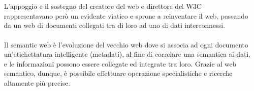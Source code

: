 \documentclass{article}
\theoremstyle{plain}
\theoremstyle{definition}
\begin{document}
\\
\\
L'appoggio e il sostegno del creatore del web e direttore del W3C rappresentavano però un evidente viatico e sprone a reinventare il web, passando da un web di documenti collegati tra di loro ad uno di dati interconnessi.
\footnotemark
{}
\\
\\
Il semantic web è l'evoluzione del vecchio web dove si associa ad ogni documento un'etichettatura intelligente (metadati), al fine di correlare una semantica ai dati, e le informazioni possono essere collegate ed integrate tra loro. Grazie al web semantico, dunque, è possibile effettuare operazione specialistiche e ricerche altamente più precise.
\end{document}
